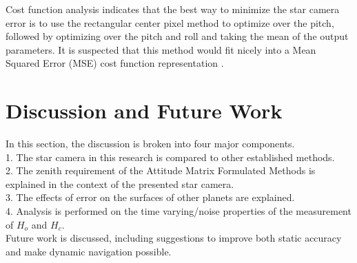 \documentclass[12pt,a4paper]{book}
\begin{document}
Cost function analysis indicates that the best way to minimize the star camera error is to use the rectangular center pixel method to optimize over the pitch, followed by optimizing over the pitch and roll and taking the mean of the output parameters.  It is suspected that this method would fit nicely into a Mean Squared Error (MSE) cost function representation \cite{b:pml}.  

\chapter{Discussion and Future Work}
In this section, the discussion is broken into four major components.  
\\
1.  The star camera in this research is compared to other established methods.  
\\
2. The zenith requirement of the Attitude Matrix Formulated Methods is explained in the context of the presented star camera.  
\\
3.  The effects of error on the surfaces of other planets are explained.
\\
4.  Analysis is performed on the time varying/noise properties of the measurement of $H_{o}$ and $H_{c}$.\\  
Future work is discussed, including suggestions to improve both static accuracy and make dynamic navigation possible.%
\end{document}
